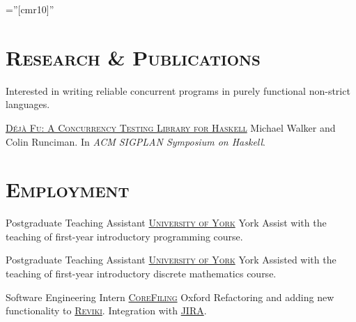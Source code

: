 \documentclass[a4paper,11pt]{moderncv}
\newcommand{\schref}[2]{\href{#1}{\textsc{#2}}}
\newcommand{\when}[1]{\multirow{2}{2cm}{\raggedleft \textsc{#1}} &}
\newcommand{\detail}[1]{ & \footnotesize{#1}}
\begin{document}
\pagestyle{empty} %

\font\fb=''[cmr10]'' %


\par{\bigskip\par}
\makecvfoot

\section{\scshape Research \& Publications}
Interested in writing reliable concurrent programs in purely
functional non-strict languages.

  {\schref{https://dl.acm.org/citation.cfm?doid=2804302.2804306}{Déjà Fu: A Concurrency Testing Library for Haskell}
  \newline{}
  Michael Walker and Colin Runciman. In \textit{ACM SIGPLAN Symposium on Haskell}.}

\section{\scshape Employment}

  {Postgraduate Teaching Assistant}
  {\schref{http://cs.york.ac.uk}{University of York}}
  {York}
  {}
  {Assist with the teaching of first-year introductory programming course.}

  {Postgraduate Teaching Assistant}
  {\schref{http://cs.york.ac.uk}{University of York}}
  {York}
  {}
  {Assisted with the teaching of first-year introductory discrete mathematics course.}

  {Software Engineering Intern}
  {\schref{http://www.corefiling.com/}{CoreFiling}}
  {Oxford}
  {}
  {Refactoring and adding new functionality to \schref{https://github.com/CoreFiling/reviki}{Reviki}.
   Integration with \schref{https://www.atlassian.com/software/jira}{JIRA}.}


\end{document}
